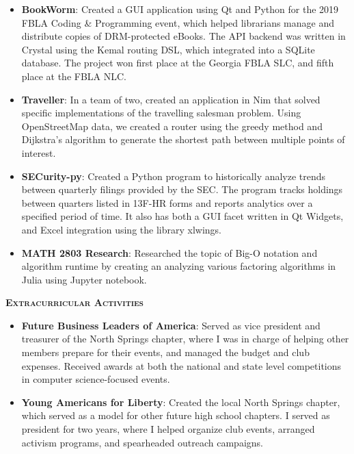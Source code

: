 \documentclass{article}
\begin{document}
  \begin{itemize}
    \item \textbf{BookWorm}: Created a GUI application using Qt and Python for the 2019 FBLA Coding \& Programming event, which helped librarians manage and distribute copies of DRM-protected eBooks. The API backend was written in Crystal using the Kemal routing DSL, which integrated into a SQLite database. The project won first place at the Georgia FBLA SLC, and fifth place at the FBLA NLC.
    \item \textbf{Traveller}: In a team of two, created an application in Nim that solved specific implementations of the travelling salesman problem. Using OpenStreetMap data, we created a router using the greedy method and Dijkstra's algorithm to generate the shortest path between multiple points of interest.
    \item \textbf{SECurity-py}: Created a Python program to historically analyze trends between quarterly filings provided by the SEC. The program tracks holdings between quarters listed in 13F-HR forms and reports analytics over a specified period of time. It also has both a GUI facet written in Qt Widgets, and Excel integration using the library xlwings.
    \item \textbf{MATH 2803 Research}: Researched the topic of Big-O notation and algorithm runtime by creating an analyzing various factoring algorithms in Julia using Jupyter notebook.
  \end{itemize}

  \vspace{10pt}

  {\large \textbf{\textsc{Extracurricular Activities}}}\hspace{5pt}\xrfill[.5ex]{.4pt}

  \vspace{3pt}

  \begin{itemize}
    \item \textbf{Future Business Leaders of America}: Served as vice president and treasurer of the North Springs chapter, where I was in charge of helping other members prepare for their events, and managed the budget and club expenses. Received awards at both the national and state level competitions in computer science-focused events.
    \item \textbf{Young Americans for Liberty}: Created the local North Springs chapter, which served as a model for other future high school chapters. I served as president for two years, where I helped organize club events, arranged activism programs, and spearheaded outreach campaigns.
  \end{itemize}
\end{document}
